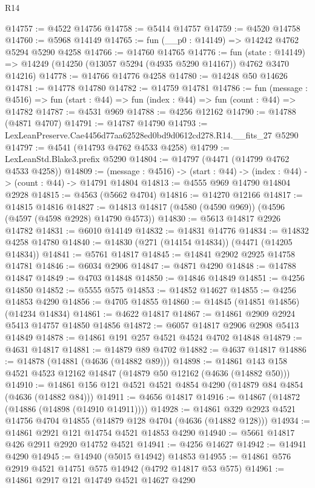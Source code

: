 \begin{lexlean}{R14}
\begin{coremodule}
@14757 := @4522 @14756
@14758 := @5414 @14757
@14759 := @4520 @14758
@14760 := @5968 @14149
@14765 := fun (__p0 : @14149) => @14242 @4762 @5294 @5290 @4258
@14766 := @14760 @14765
@14776 := fun (state : @14149) =>
  @14249 (@14250 (@13057 @5294 (@4935 @5290 @14167)) @4762 @3470 @14216)
@14778 := @14766 @14776 @4258
@14780 := @14248 @50 @14626
@14781 := @14778 @14780
@14782 := @14759 @14781
@14786 := fun (message : @4516) =>
  fun (start : @44) => fun (index : @44) => fun (count : @44) => @14782
@14787 := @4531 @969
@14788 := @4256 @12162
@14790 := @14788 (@4871 @4707)
@14791 := @14787 @14790
@14793 := LexLeanPreserve.Cae4456d77aa62528ed0bd9d0612cd278.R14.__fits_27 @5290
@14797 := @4541 (@14793 @4762 @4533 @4258)
@14799 := LexLeanStd.Blake3.prefix @5290
@14804 := @14797 (@4471 (@14799 @4762 @4533 @4258))
@14809 := (message : @4516) -> (start : @44) -> (index : @44) -> (count : @44) -> @14791 @14804
@14813 := @4555 @969 @14790 @14804 @2928
@14815 := @4563 (@5662 @4704)
@14816 := @14270 @12166
@14817 := @14815 @14816
@14827 := @14813 @14817 (@4580 (@4590 @969)) (@4596 (@4597 (@4598 @2928) @14790 @4573))
@14830 := @5613 @14817 @2926 @14782
@14831 := @6010 @14149
@14832 := @14831 @14776
@14834 := @14832 @4258 @14780
@14840 := @14830 (@271 (@14154 @14834)) (@4471 (@14205 @14834))
@14841 := @5761 @14817
@14845 := @14841 @2902 @2925 @14758 @14781
@14846 := @6034 @2906
@14847 := @4871 @4290
@14848 := @14788 @14847
@14849 := @4703 @14848
@14850 := @14846 @14849
@14851 := @4256 @14850
@14852 := @5555 @575
@14853 := @14852 @14627
@14855 := @4256 @14853 @4290
@14856 := @4705 @14855
@14860 := @14845 (@14851 @14856) (@14234 @14834)
@14861 := @4622 @14817
@14867 := @14861 @2909 @2924 @5413 @14757 @14850 @14856
@14872 := @6057 @14817 @2906 @2908 @5413 @14849
@14878 := @14861 @191 @257 @4521 @4524 @4702 @14848
@14879 := @4631 @14817
@14881 := @14879 @89 @4702
@14882 := @4637 @14817
@14886 := @14878 (@14881 (@4636 (@14882 @89)))
@14898 := @14861 @143 @158 @4521 @4523 @12162 @14847 (@14879 @50 @12162 (@4636 (@14882 @50)))
@14910 := @14861 @156 @121 @4521 @4521 @4854 @4290 (@14879 @84 @4854 (@4636 (@14882 @84)))
@14911 := @4656 @14817
@14916 := @14867 (@14872 (@14886 (@14898 (@14910 @14911))))
@14928 := @14861 @329 @2923 @4521 @14756 @4704 @14855 (@14879 @128 @4704 (@4636 (@14882 @128)))
@14934 := @14861 @2921 @121 @14754 @4521 @14853 @4290
@14940 := @5661 @14817 @426 @2911 @2920 @14752 @4521
@14941 := @4256 @14627
@14942 := @14941 @4290
@14945 := @14940 (@5015 @14942) @14853
@14955 := @14861 @576 @2919 @4521 @14751 @575 @14942 (@4792 @14817 @53 @575)
@14961 := @14861 @2917 @121 @14749 @4521 @14627 @4290

\end{coremodule}
\end{lexlean}
